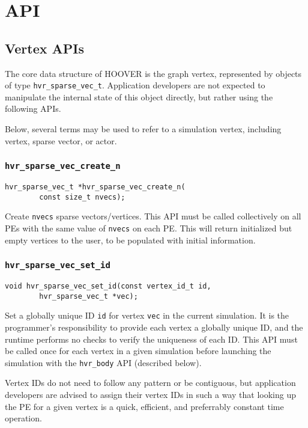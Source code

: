 \section{API}

\subsection{Vertex APIs}

The core data structure of HOOVER is the graph vertex, represented by objects of
type \texttt{hvr\_sparse\_vec\_t}. Application developers are not expected to
manipulate the internal state of this object directly, but rather using the
following APIs.

Below, several terms may be used to refer to a simulation vertex, including
vertex, sparse vector, or actor.

\subsubsection{\texttt{hvr\_sparse\_vec\_create\_n}}

\begin{verbatim}
hvr_sparse_vec_t *hvr_sparse_vec_create_n(
        const size_t nvecs);
\end{verbatim}

Create \texttt{nvecs} sparse vectors/vertices. This API must be called
collectively on all PEs with the same value of \texttt{nvecs} on each PE. This
will return initialized but empty vertices to the user, to be populated with
initial information.

\subsubsection{\texttt{hvr\_sparse\_vec\_set\_id}}

\begin{verbatim}
void hvr_sparse_vec_set_id(const vertex_id_t id,
        hvr_sparse_vec_t *vec);
\end{verbatim}

Set a globally unique ID \texttt{id} for vertex \texttt{vec} in the current
simulation. It is the programmer's responsibility to provide each vertex a
globally unique ID, and the runtime performs no checks to verify the uniqueness
of each ID. This API must be called once for each vertex in a given simulation
before launching the simulation with the \texttt{hvr\_body} API (described
below).

Vertex IDs do not need to follow any pattern or be contiguous, but application
developers are advised to assign their vertex IDs in such a way that looking up
the PE for a given vertex is a quick, efficient, and preferrably constant time
operation.

